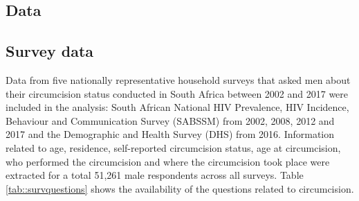\documentclass{article}
\begin{document}
\begin{appendix}

\section{Data}


\subsection{Survey data}


\noindent Data from five nationally representative household surveys that asked men about their circumcision status conducted in South Africa between 2002 and 2017 were included in the analysis: South African National HIV Prevalence, HIV Incidence, Behaviour and Communication Survey (SABSSM) from 2002, 2008, 2012 and 2017 and the Demographic and Health Survey (DHS) from 2016. Information related to age, residence, self-reported circumcision status, age at circumcision, who performed the circumcision and where the circumcision took place were extracted for a total 51,261 male respondents across all surveys. Table \ref{tab::survquestions} shows the availability of the questions related to circumcision.\\


\end{appendix}
\end{document}
